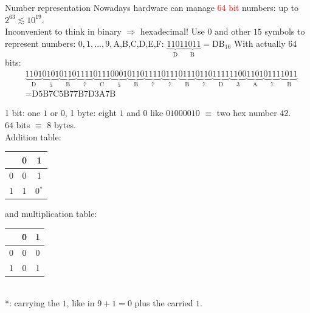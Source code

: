 \documentclass[10pt]{beamer}
\newcommand{\red}[1]{\textcolor{red}{#1}}
\renewcommand{\[}{\begin{equation*}}
\renewcommand{\]}{\end{equation*}}
\begin{document}
\begin{frame}{Number representation}
Nowadays hardware can manage \red{64 bit} numbers: up to $2^{63}\lesssim 10^{19}$.\\
Inconvenient to think in binary $\Rightarrow$ hexadecimal! Use $0$ and other $15$ symbols to represent numbers: $0,1,...,9,$A,B,C,D,E,F: 
$
\underbrace{1101}_{\text{D}}\underbrace{1011}_{\text{B}} = \text{DB}_{16}
$
With actually 64 bits:
\[\begin{split}
&\underbrace{1101}_{\text{D}}\underbrace{0101}_{\text{5}}\underbrace{0110}_{\text{B}}\underbrace{1111}_{\text{7}}\underbrace{0111}_{\text{C}}\underbrace{0001}_{\text{5}}\underbrace{0110}_{\text{B}}\underbrace{1111}_{\text{7}}\underbrace{0111}_{\text{7}}\underbrace{0111}_{\text{B}}\underbrace{0110}_{\text{7}}\underbrace{1111}_{\text{D}}\underbrace{1100}_{\text{3}}\underbrace{1101}_{\text{A}}\underbrace{0111}_{\text{7}}\underbrace{1011}_{\text{B}} \\ &= \text{D5B7C5B77B7D3A7B}
\end{split}
\]

1 bit: one $1$ or $0$, 1 byte: eight $1$ and $0$ like $01000010$ $\equiv$ two hex number $42$.\\
$64$ bits $\equiv$ $8$ bytes.\\
Addition table: \begin{tabular}{c|c|c}
  & 0 & 1 \\
  \hline
0 & 0 & 1\\
1 & 1 & 0$^*$
\end{tabular}  and multiplication table: \begin{tabular}{c|c|c}
  & 0 & 1 \\
  \hline
0 & 0 & 0\\
1 & 0 & 1
\end{tabular}\\
*: carrying the $1$, like in $9+1 = 0$ plus the carried $1$.

\end{frame}
\end{document}
